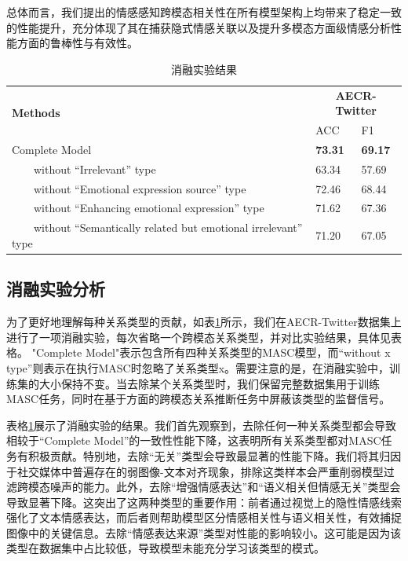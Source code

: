 总体而言，我们提出的情感感知跨模态相关性在所有模型架构上均带来了稳定一致的性能提升，充分体现了其在捕获隐式情感关联以及提升多模态方面级情感分析性能方面的鲁棒性与有效性。

 
 
\begin{table}[htbp]
  \centering
    \caption{消融实验结果}
    \label{tab:Ablation}
\begin{tabular}{lll}
\toprule
   \multirow{2}{*}{\textbf{Methods}} & \multicolumn{2}{c}{\textbf{AECR-Twitter}} \\
    & ACC & F1   \\
    \hline
    Complete Model& \textbf{73.31}&\textbf{69.17} \\    
    ~~~~without ``Irrelevant'' type & 63.34  &57.69  \\
    ~~~~without ``Emotional expression source'' type & 72.46  &68.44  \\
    ~~~~without ``Enhancing emotional expression'' type& 71.62  &67.36  \\
    ~~~~without ``Semantically related but emotional irrelevant'' type& 71.20  &67.05  \\
\bottomrule
\end{tabular}
\end{table}

\subsection{消融实验分析}
为了更好地理解每种关系类型的贡献，如表\ref{tab:Ablation}所示，我们在AECR-Twitter数据集上进行了一项消融实验，每次省略一个跨模态关系类型，并对比实验结果，具体见表格。 "Complete Model"表示包含所有四种关系类型的MASC模型，而“without x type”则表示在执行MASC时忽略了关系类型x。需要注意的是，在消融实验中，训练集的大小保持不变。当去除某个关系类型时，我们保留完整数据集用于训练MASC任务，同时在基于方面的跨模态关系推断任务中屏蔽该类型的监督信号。

表格\ref{tab:Ablation}展示了消融实验的结果。我们首先观察到，去除任何一种关系类型都会导致相较于“Complete Model”的一致性性能下降，这表明所有关系类型都对MASC任务有积极贡献。特别地，去除“无关”类型会导致最显著的性能下降。我们将其归因于社交媒体中普遍存在的弱图像-文本对齐现象，排除这类样本会严重削弱模型过滤跨模态噪声的能力。此外，去除“增强情感表达”和“语义相关但情感无关”类型会导致显著下降。这突出了这两种类型的重要作用：前者通过视觉上的隐性情感线索强化了文本情感表达，而后者则帮助模型区分情感相关性与语义相关性，有效捕捉图像中的关键信息。去除“情感表达来源”类型对性能的影响较小。这可能是因为该类型在数据集中占比较低，导致模型未能充分学习该类型的模式。

